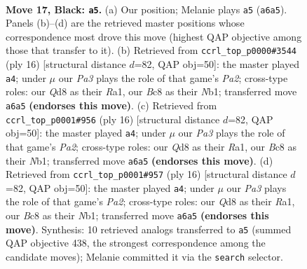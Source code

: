 \documentclass[11pt]{article}
\begin{document}
\clearpage

\begin{figure}[p]\centering
\begin{subfigure}{0.46\textwidth}\centering
\resizebox{\linewidth}{!}{%
\newchessgame
\chessboard[
  setfen={rnbqr1k1/2pn2pp/pp2p3/3pPp2/3P1P1P/6Q1/PPP1N1P1/1R2KBNR b - - 9 17},
  showmover=false,
  pgfstyle=straightmove, color=movearrow, markmove={a6-a5}
]}
\caption{}
\end{subfigure}\hfill
\begin{subfigure}{0.46\textwidth}\centering
\resizebox{\linewidth}{!}{%
\newchessgame
\chessboard[
  setfen={rnbqk2r/1p3ppp/2p1pn2/p7/2pP4/5NP1/PP1QPPBP/RN2K2R w KQkq - 0 9},
  showmover=false,
  pgfstyle=straightmove, color=movearrow, markmove={a2-a4}
]}
\caption{}
\end{subfigure}
\\[4pt]
\begin{subfigure}{0.46\textwidth}\centering
\resizebox{\linewidth}{!}{%
\newchessgame
\chessboard[
  setfen={rnbqk2r/1p3ppp/2p1pn2/p7/2pP4/5NP1/PP1QPPBP/RN2K2R w KQkq - 0 9},
  showmover=false,
  pgfstyle=straightmove, color=movearrow, markmove={a2-a4}
]}
\caption{}
\end{subfigure}\hfill
\begin{subfigure}{0.46\textwidth}\centering
\resizebox{\linewidth}{!}{%
\newchessgame
\chessboard[
  setfen={rnbqk2r/1p3ppp/2p1pn2/p7/2pP4/5NP1/PP1QPPBP/RN2K2R w KQkq - 0 9},
  showmover=false,
  pgfstyle=straightmove, color=movearrow, markmove={a2-a4}
]}
\caption{}
\end{subfigure}
\caption{\textbf{Move 17, Black: \texttt{a5}.} (a) Our position; Melanie plays \texttt{a5} (\texttt{a6a5}). Panels (b)--(d) are the retrieved master positions whose correspondence most drove this move (highest QAP objective among those that transfer to it). (b) Retrieved from \texttt{ccrl\_top\_p0000\#3544} (ply 16) [structural distance $d$=82, QAP obj=50]: the master played \texttt{a4}; under $\mu$ our \emph{Pa3} plays the role of that game's \emph{Pa2}; cross-type roles: our \emph{Q}d8 as their \emph{R}a1, our \emph{B}c8 as their \emph{N}b1; transferred move \texttt{a6a5} \textbf{(endorses this move)}. (c) Retrieved from \texttt{ccrl\_top\_p0001\#956} (ply 16) [structural distance $d$=82, QAP obj=50]: the master played \texttt{a4}; under $\mu$ our \emph{Pa3} plays the role of that game's \emph{Pa2}; cross-type roles: our \emph{Q}d8 as their \emph{R}a1, our \emph{B}c8 as their \emph{N}b1; transferred move \texttt{a6a5} \textbf{(endorses this move)}. (d) Retrieved from \texttt{ccrl\_top\_p0001\#957} (ply 16) [structural distance $d$=82, QAP obj=50]: the master played \texttt{a4}; under $\mu$ our \emph{Pa3} plays the role of that game's \emph{Pa2}; cross-type roles: our \emph{Q}d8 as their \emph{R}a1, our \emph{B}c8 as their \emph{N}b1; transferred move \texttt{a6a5} \textbf{(endorses this move)}. Synthesis: 10 retrieved analogs transferred to \texttt{a5} (summed QAP objective 438, the strongest correspondence among the candidate moves); Melanie committed it via the \texttt{search} selector.}
\label{fig:thought-m33}
\end{figure}
\end{document}
